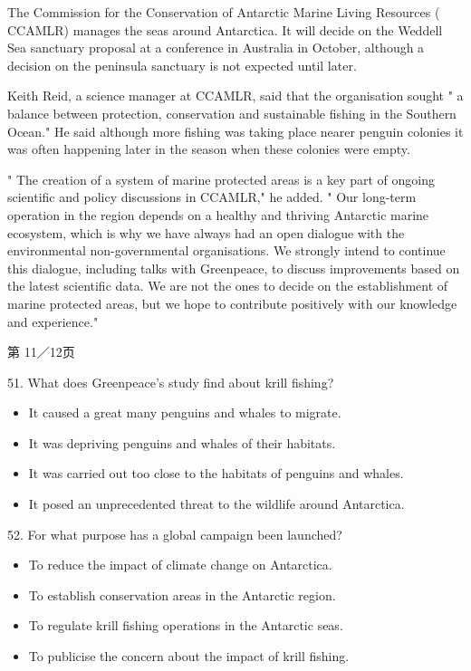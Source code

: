 \documentclass[UTF8,11pt]{ctexart}
\begin{document}
The Commission for the Conservation of Antarctic Marine Living Resources ( CCAMLR) manages the seas around Antarctica. It will decide on the Weddell Sea sanctuary proposal at a conference in Australia in October, although a decision on the peninsula sanctuary is not expected until later.


Keith Reid, a science manager at CCAMLR, said that the organisation sought " a balance between protection, conservation and sustainable fishing in the Southern Ocean." He said although more fishing was taking place nearer penguin colonies it was often happening later in the season when these colonies were empty.


" The creation of a system of marine protected areas is a key part of ongoing scientific and policy discussions in CCAMLR," he added. " Our long-term operation in the region depends on a healthy and thriving Antarctic marine ecosystem, which is why we have always had an open dialogue with the environmental non-governmental organisations. We strongly intend to continue this dialogue, including talks with Greenpeace, to discuss improvements based on the latest scientific data. We are not the ones to decide on the establishment of marine protected areas, but we hope to contribute positively with our knowledge and experience."


第 11／12页


51. What does Greenpeace's study find about krill fishing?


\begin{itemize}[leftmargin=2em,itemsep=.2em,topsep=.4em]\item[A.] It caused a great many penguins and whales to migrate.
\item[B.] It was depriving penguins and whales of their habitats.
\item[C.] It was carried out too close to the habitats of penguins and whales.
\item[D.] It posed an unprecedented threat to the wildlife around Antarctica.
\end{itemize}

52. For what purpose has a global campaign been launched?


\begin{itemize}[leftmargin=2em,itemsep=.2em,topsep=.4em]\item[A.] To reduce the impact of climate change on Antarctica.
\item[B.] To establish conservation areas in the Antarctic region.
\item[C.] To regulate krill fishing operations in the Antarctic seas.
\item[D.] To publicise the concern about the impact of krill fishing.
\end{itemize}
\end{document}

